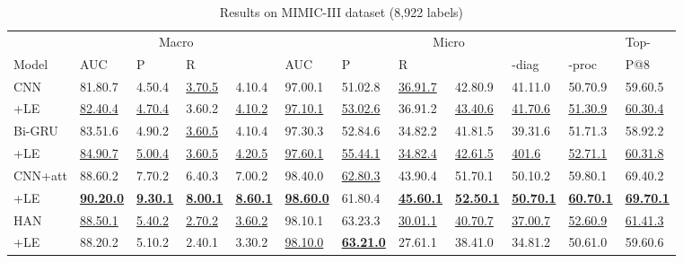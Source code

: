 \documentclass[final,5p,times,twocolumn]{elsarticle}
\begin{document}
\begin{table*}[th]
\caption{Results on MIMIC-III dataset (8,922 labels)}\label{mimic-iii-results}
\center
\footnotesize
\begin{threeparttable}
\begin{tabular}{lp{1cm}p{1cm}p{1cm}p{1cm}|p{1cm}p{1cm}p{1cm}p{1cm}p{1cm}p{1cm}|p{1cm}}
\cline{1-12}
                     & \multicolumn{4}{c}{Macro}      & \multicolumn{6}{c}{Micro}                              & Top- \\
Model                & AUC      & P & R  &       & AUC      & P & R   &        & -diag  & -proc  & P@8   \\
\cline{1-12}
CNN                  & 81.80.7 & 4.50.4   & \underline{3.70.5} & 4.10.4 & 97.00.1   & 51.02.8    & \underline{36.91.7} & 42.80.9 & 41.11.0   & 50.70.9 & 59.60.5      \\
+LE               & \underline{82.40.4} & \underline{4.70.4}   & 3.60.2 & \underline{4.10.2} & \underline{97.10.1} & \underline{53.02.6}    & 36.91.2 & \underline{43.40.6} & \underline{41.70.6} & \underline{51.30.9} & \underline{60.30.4}      \\
\cline{1-12}
Bi-GRU               & 83.51.6 & 4.90.2   & \underline{3.60.5} & 4.10.4 & 97.30.3 & 52.84.6  & 34.82.2 & 41.81.5 & 39.31.6 & 51.71.3 & 58.92.2      \\
+LE            & \underline{84.90.7} & \underline{5.00.4}     & \underline{3.60.5} & \underline{4.20.5} & \underline{97.60.1} & \underline{55.44.1}  & \underline{34.82.4} & \underline{42.61.5} & \underline{401.6}   & \underline{52.71.1} & \underline{60.31.8}      \\
\cline{1-12}
CNN+att              & 88.60.2 & 7.70.2   & 6.40.3 & 7.00.2   & 98.40.0   & \underline{62.80.3}  & 43.90.4 & 51.70.1 & 50.10.2 & 59.80.1 & 69.40.2      \\
+LE           & \textbf{\underline{90.20.0}}   & \textbf{\underline{9.30.1}}   & \textbf{\underline{8.00.1}}   & \textbf{\underline{8.60.1}} & \textbf{\underline{98.60.0}}   & 61.80.4  & \textbf{\underline{45.60.1}} & \textbf{\underline{52.50.1}} & \textbf{\underline{50.70.1}} & \textbf{\underline{60.70.1}} & \textbf{\underline{69.70.1}}      \\
\cline{1-12}
HAN                  & \underline{88.50.1} & \underline{5.40.2}   & \underline{2.70.2} & \underline{3.60.2} & 98.10.1 & 63.23.3  & \underline{30.01.1}   & \underline{40.70.7} & \underline{37.00.7}   & \underline{52.60.9} & \underline{61.41.3}      \\
+LE               & 88.20.2 & 5.10.2   & 2.40.1 & 3.30.2 & \underline{98.10.0}   & \textbf{\underline{63.21.0}}    & 27.61.1 & 38.41.0   & 34.81.2 & 50.61.0   & 59.60.6      \\

\end{tabular}
\end{threeparttable}
\end{table*}
\end{document}
